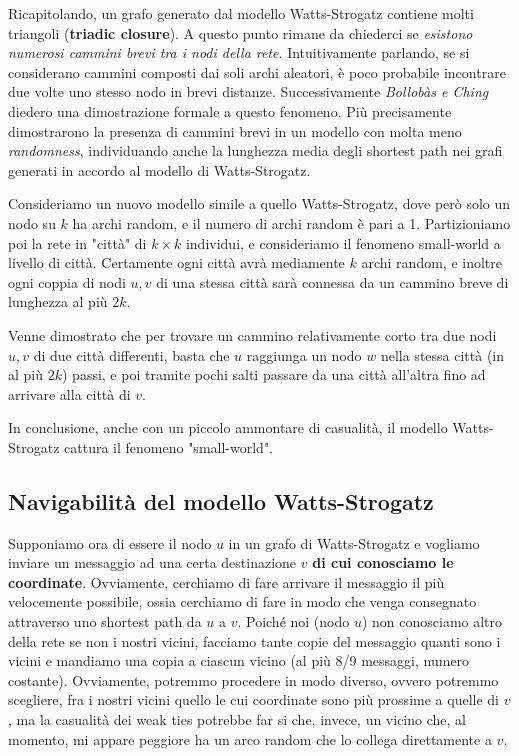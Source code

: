 Ricapitolando, un grafo generato dal modello Watts-Strogatz contiene molti triangoli (\textbf{triadic closure}).
A questo punto rimane da chiederci se \textit{esistono numerosi cammini brevi tra i nodi della rete}.
Intuitivamente parlando, se si considerano cammini composti dai soli archi aleatori, è poco probabile incontrare due volte uno stesso nodo in brevi distanze. Successivamente \textit{Bollobàs e Ching} diedero una dimostrazione formale a questo fenomeno.
Più precisamente dimostrarono la presenza di cammini brevi in un modello con molta meno \textit{randomness}, individuando anche la lunghezza media degli shortest path nei grafi generati in accordo al modello di Watts-Strogatz. 

Consideriamo un nuovo modello simile a quello Watts-Strogatz, dove però solo un nodo su $k$ ha archi random, e il numero di archi random è pari a 1.
Partizioniamo poi la rete in "città" di $k \times k$ individui, e consideriamo il fenomeno small-world a livello di città.
Certamente ogni città avrà mediamente $k$ archi random, e inoltre ogni coppia di nodi $u,v$ di una stessa città sarà connessa da un cammino breve di lunghezza al più $2k$.

Venne dimostrato che per trovare un cammino relativamente corto tra due nodi $u,v$ di due città differenti, basta che $u$ raggiunga un nodo $w$ nella stessa città (in al più $2k$) passi, e poi tramite pochi salti passare da una città all'altra fino ad arrivare alla città di $v$.

In conclusione, anche con un piccolo ammontare di casualità, il modello Watts-Strogatz cattura il fenomeno "small-world".

\subsection{Navigabilità del modello Watts-Strogatz}

Supponiamo ora di essere il nodo $u$ in un grafo di Watts-Strogatz e vogliamo inviare un messaggio ad una certa destinazione $v$ \textbf{di cui conosciamo le coordinate}. Ovviamente, cerchiamo di fare arrivare il messaggio il più velocemente possibile, ossia cerchiamo di fare in modo che venga consegnato attraverso uno shortest path da $u$ a $v$. Poiché noi (nodo $u$) non conosciamo altro della rete se non i nostri vicini, facciamo tante copie del messaggio quanti sono i vicini e mandiamo una copia a ciascun vicino (al più 8/9 messaggi, numero costante). Ovviamente, potremmo procedere in modo diverso, ovvero potremmo scegliere, fra i nostri vicini quello le cui coordinate sono più prossime a quelle di $v$, ma la casualità dei weak ties potrebbe far si che, invece, un vicino che, al momento, mi appare peggiore ha un arco random che lo collega direttamente a $v$.

